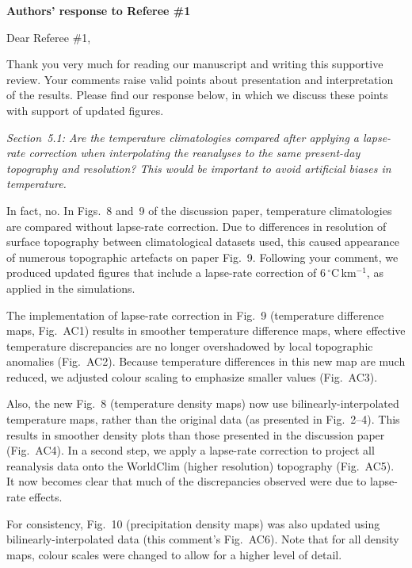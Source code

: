 \documentclass[10pt]{article}
\begin{document}
\textbf{Authors' response to Referee {\#}1}
\bigskip


\renewcommand\thefigure{AC\arabic{figure}}
\def\referee#1{\bigskip\textcolor{journalname}{\textit{#1}}}

Dear Referee {\#}1,

Thank you very much for reading our manuscript and writing this supportive review. Your comments raise valid points about presentation and interpretation of the results. Please find our response below, in which we discuss these points with support of updated figures.

\referee{Section~5.1: Are the temperature climatologies compared after applying a lapse-rate correction when interpolating the reanalyses to the same present-day topography and resolution? This would be important to avoid artificial biases in temperature.}

In fact, no. In Figs.~8 and~9 of the discussion paper, temperature climatologies are compared without lapse-rate correction. Due to differences in resolution of surface topography between climatological datasets used, this caused appearance of numerous topographic artefacts on paper Fig.~9. Following your comment, we produced updated figures that include a lapse-rate correction of 6\,{$^\circ$}C\,km$^{-1}$, as applied in the simulations.

The implementation of lapse-rate correction in Fig.~9 (temperature difference maps, Fig.~AC1)  results in smoother temperature difference maps, where effective temperature discrepancies are no longer overshadowed by local topographic anomalies (Fig.~AC2). Because temperature differences in this new map are much reduced, we adjusted colour scaling to emphasize smaller values (Fig.~AC3).

Also, the new Fig.~8 (temperature density maps) now use bilinearly-interpolated temperature maps, rather than the original data (as presented in Fig.~2--4). This results in smoother density plots than those presented in the discussion paper (Fig.~AC4). In a second step, we apply a lapse-rate correction to project all reanalysis data onto the WorldClim (higher resolution) topography (Fig.~AC5). It now becomes clear that much of the discrepancies observed were due to lapse-rate effects.

For consistency, Fig.~10 (precipitation density maps) was also updated using bilinearly-interpolated data (this comment's Fig.~AC6). Note that for all density maps, colour scales were changed to allow for a higher level of detail.
\end{document}
